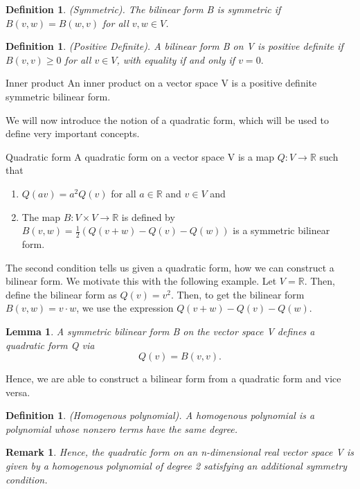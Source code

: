 \documentclass[twoside]{article}
\newtheorem{lemma}[theorem]{Lemma}
\newtheorem{definition}[theorem]{Definition}
\newtheorem{remark}[theorem]{Remark}
\begin{document}
\begin{definition}(Symmetric). The bilinear form B is symmetric if $B(v,w) = B(w,v)$ for all $v,w \in V$.
\end{definition}

\begin{definition}(Positive Definite). A bilinear form B on V is positive definite if $B(v,v) \geq 0$ for all $v \in V$, with equality if and only if $v = 0.$
\end{definition}

\begin{definition_exam}{Inner product}{} An inner product on a vector space V is a positive definite symmetric bilinear form.
\end{definition_exam}

We will now introduce the notion of a quadratic form, which will be used to define very important concepts.

\begin{definition_exam}{Quadratic form}{} A quadratic form on a vector space V is a map $Q: V \rightarrow \mathbb{R}$ such that 
\begin{enumerate}
    \item $Q(av) = a^2Q(v)$ for all $a \in \mathbb{R}$ and $v \in V$ and 
    \item The map $B: V \times V \rightarrow \mathbb{R}$ is defined by $B(v,w) = \frac{1}{2}(Q(v+w) - Q(v) - Q(w))$ is a symmetric bilinear form.
\end{enumerate}
\end{definition_exam}

The second condition tells us given a quadratic form, how we can construct a bilinear form. We motivate this with the following example. Let $V = \mathbb{R}.$ Then, define the bilinear form as $Q(v) = v^2$. Then, to get the bilinear form $B(v,w) = v\cdot w$, we use the expression $Q(v+w) - Q(v) - Q(w).$

\begin{lemma}A symmetric bilinear form B on the vector space V defines a quadratic form Q via 
$$
Q(v) = B(v,v).
$$
\end{lemma}
Hence, we are able to construct a bilinear form from a quadratic form and vice versa.

\begin{definition}(Homogenous polynomial). A homogenous polynomial is a polynomial whose nonzero terms have the same degree.
\end{definition}

\begin{remark}Hence, the quadratic form on an n-dimensional real vector space V is given by a homogenous polynomial of degree 2 satisfying an additional symmetry condition.
\end{remark}
\end{document}
